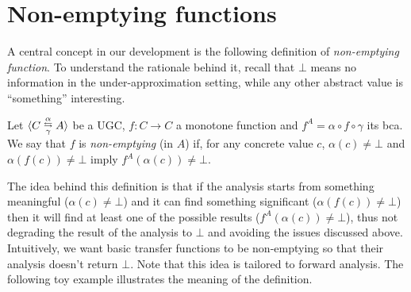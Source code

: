 \section{Non-emptying functions}\label{sec:uai:non-emptying}
A central concept in our development is the following definition of \emph{non-emptying function}. To understand the rationale behind it, recall that $\bot$ means no information in the under-approximation setting, while any other abstract value is ``something'' interesting.
\begin{definition}\label{def:uai:non-emptying}
	Let $\langle C \mathrel{\substack{\alpha \\ \leftrightarrows \\ \gamma}} A\rangle$ be a UGC, $f : C \rightarrow C$ a monotone function and $f^{A} = \alpha \circ f \circ \gamma$ its bca.
	We say that $f$ is \emph{non-emptying} (in $A$) if, for any concrete value $c$, $\alpha(c) \neq \bot$ and $\alpha(f(c)) \neq \bot$ imply $f^{A}(\alpha(c)) \neq \bot$.
\end{definition}
The idea behind this definition is that if the analysis starts from something meaningful ($\alpha(c) \neq \bot$) and it can find something significant ($\alpha(f(c)) \neq \bot$) then it will find at least one of the possible results ($f^{A}(\alpha(c)) \neq \bot$), thus not degrading the result of the analysis to $\bot$ and avoiding the issues discussed above. Intuitively, we want basic transfer functions to be non-emptying so that their analysis doesn't return $\bot$. Note that this idea is tailored to forward analysis. The following toy example illustrates the meaning of the definition.
